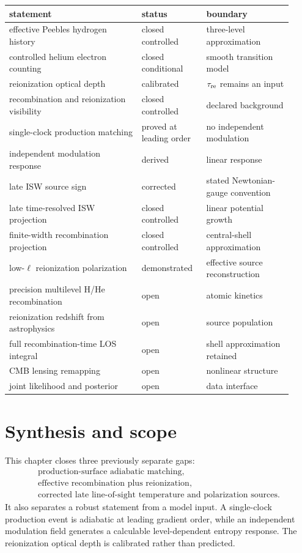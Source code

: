 \begin{center}
\small
\begin{tabular}{p{0.43\linewidth}p{0.21\linewidth}p{0.28\linewidth}}
\toprule
statement & status & boundary\\
\midrule
effective Peebles hydrogen history & closed controlled & three-level approximation\\
controlled helium electron counting & closed conditional & smooth transition model\\
reionization optical depth & calibrated & $\tau_{\rm re}$ remains an input\\
recombination and reionization visibility & closed controlled & declared background\\
single-clock production matching & proved at leading order & no independent modulation\\
independent modulation response & derived & linear response\\
late ISW source sign & corrected & stated Newtonian-gauge convention\\
late time-resolved ISW projection & closed controlled & linear potential growth\\
finite-width recombination projection & closed controlled & central-shell approximation\\
low-$\ell$ reionization polarization & demonstrated & effective source reconstruction\\
precision multilevel H/He recombination & open & atomic kinetics\\
reionization redshift from astrophysics & open & source population\\
full recombination-time LOS integral & open & shell approximation retained\\
CMB lensing remapping & open & nonlinear structure\\
joint likelihood and posterior & open & data interface\\
\bottomrule
\end{tabular}
\end{center}

\section{Synthesis and scope}

This chapter closes three previously separate gaps:
\begin{equation}
\boxed{
\begin{gathered}
\text{production-surface adiabatic matching},\\
\text{effective recombination plus reionization},\\
\text{corrected late line-of-sight temperature and polarization sources}.
\end{gathered}}
\label{eq:trl-closed-chain}
\end{equation}
It also separates a robust statement from a model input.  A single-clock production event is adiabatic at leading gradient order, while an independent modulation field generates a calculable level-dependent entropy response.  The reionization optical depth is calibrated rather than predicted.

